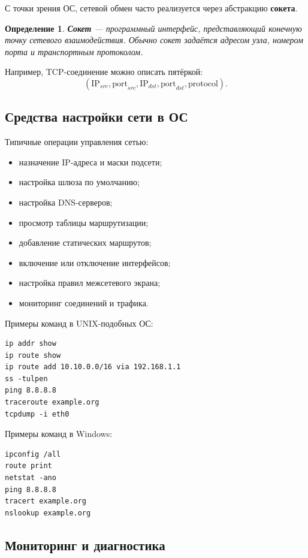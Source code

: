 \documentclass[12pt,a4paper]{article}
\newtheorem{definition}{Определение}
\begin{document}
С точки зрения ОС, сетевой обмен часто реализуется через абстракцию \textbf{сокета}.

\begin{definition}
\textbf{Сокет} --- программный интерфейс, представляющий конечную точку сетевого взаимодействия. Обычно сокет задаётся адресом узла, номером порта и транспортным протоколом.
\end{definition}

Например, TCP-соединение можно описать пятёркой:
\[
(\text{IP}_{src}, \text{port}_{src}, \text{IP}_{dst}, \text{port}_{dst}, \text{protocol}).
\]

\subsection{Средства настройки сети в ОС}

Типичные операции управления сетью:
\begin{itemize}
    \item назначение IP-адреса и маски подсети;
    \item настройка шлюза по умолчанию;
    \item настройка DNS-серверов;
    \item просмотр таблицы маршрутизации;
    \item добавление статических маршрутов;
    \item включение или отключение интерфейсов;
    \item настройка правил межсетевого экрана;
    \item мониторинг соединений и трафика.
\end{itemize}

Примеры команд в UNIX-подобных ОС:

\begin{lstlisting}
ip addr show
ip route show
ip route add 10.10.0.0/16 via 192.168.1.1
ss -tulpen
ping 8.8.8.8
traceroute example.org
tcpdump -i eth0
\end{lstlisting}

Примеры команд в Windows:

\begin{lstlisting}
ipconfig /all
route print
netstat -ano
ping 8.8.8.8
tracert example.org
nslookup example.org
\end{lstlisting}

\subsection{Мониторинг и диагностика}
\end{document}
